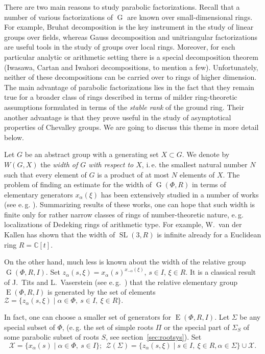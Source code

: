 \documentclass[12pt]{amsart}
\theoremstyle{plain} \declaretheorem[name=Theorem, Refname={Theorem,Theorems}]{thm} \Crefname{thm}{Theorem}{Theorems}
\numberwithin{equation}{section}
\theoremstyle{definition} \newtheorem{dfn}[lemma]{Definition} \Crefname{dfn}{Definition}{Definitions}
\theoremstyle{remark} \newtheorem{rem}[lemma]{Remark} \Crefname{rem}{Remark}{Remarks}
\DeclareMathOperator{\G}{G}
\DeclareMathOperator{\SL}{SL}
\DeclareMathOperator{\E}{E}
\begin{document}
There are two main reasons to study parabolic factorizations.
Recall that a number of various factorizations of $\G$ are known over small-dimensional rings.
For example, Bruhat decomposition is the key instrument in the study of linear groups over fields, whereas Gauss decomposition and unitriangular factorizations are useful tools in the study of groups over local rings.
Moreover, for each particular analytic or arithmetic setting there is a special decomposition theorem (Iwasawa, Cartan and Iwahori decompositions, to mention a few).
Unfortunately, neither of these decompositions can be carried over to rings of higher dimension.
The main advantage of parabolic factorizations lies in the fact that they remain true for a broader class of rings described in terms of milder ring-theoretic assumptions formulated in terms of the \emph{stable rank} of the ground ring.
Their another advantage is that they prove useful in the study of asymptotical properties of Chevalley groups. We are going to discuss this theme in more detail below.

Let $G$ be an abstract group with a generating set $X \subset G$. 
We denote by $W(G, X)$ the \emph{width of $G$ with respect to $X$}, i.\,e. the smallest natural number $N$ such that every element of $G$ is a product of at most $N$ elements of $X$.
The problem of finding an estimate for the width of $\G(\Phi, R)$ in terms of elementary generators $x_\alpha(\xi)$ has been extensively studied in a number of works (see e.\,g. \cite{CK83, Ka82, Tavgen91, Mo07, VseUnitrZ1p, VavSmSuUnitrEng}).
Summarizing results of these works, one can hope that such width is finite only for rather narrow classes of rings of number-theoretic nature, e.\,g. localizations of Dedeking rings of arithmetic type.
For example, W.~van der Kallen has shown that the width of $\SL(3,R)$ is infinite already for a Euclidean ring $R=\mathbb{C}[t]$.

On the other hand, much less is known about the width of the relative group $\G(\Phi, R, I)$. 
Set $z_\alpha(s, \xi) = x_{\alpha}(s)^{x_{-\alpha}(\xi)}$, $s\in I$, $\xi\in R$.
It is a classical result of J.~Tits and L.~Vaserstein (see e.\,g.~\cite[Theorem~2]{Va86}) that the relative elementary group $\E(\Phi, R, I)$ is generated by
the set of elements $\mathcal{Z} = \{ z_\alpha(s,\xi) \mid \alpha \in \Phi,\ s\in I,\ \xi \in R \}.$

In fact, one can choose a smaller set of generators for $\E(\Phi, R, I)$. 
Let $\Sigma$ be any special subset of $\Phi$, (e.\,g. the set of simple roots $\Pi$ or the special part of $\Sigma_S$ of some parabolic subset of roots $S$, see section~\ref{sec:rootsys}).
Set $$\mathcal{X} = \{ x_\alpha(s) \mid \alpha\in \Phi,\ s\in I\};\ \ \mathcal{Z}(\Sigma) = \{ z_\alpha(s, \xi) \mid s \in I,\ \xi \in R, \alpha\in \Sigma \} \cup \mathcal{X}.$$ 
\end{document}
